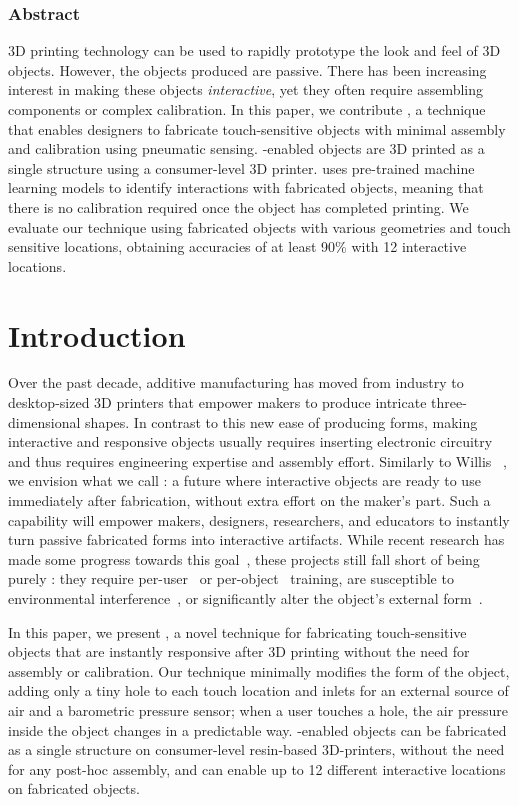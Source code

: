 	\subsubsection*{Abstract}
		3D printing technology can be used to rapidly prototype the look and feel of
		3D objects. However, the objects produced are passive. There has been
		increasing interest in making these objects \emph{interactive}, yet they
		often require assembling components or complex calibration. In this paper,
		we contribute \emph{\at}, a technique that enables designers to fabricate
		touch-sensitive objects with minimal assembly and calibration using
		pneumatic sensing. \at-enabled objects are 3D printed as a single structure
		using a consumer-level 3D printer. \at uses pre-trained machine learning
		models to identify interactions with fabricated objects, meaning that there
		is no calibration required once the object has completed printing. We
		evaluate our technique using fabricated objects with various geometries and
		touch sensitive locations, obtaining accuracies of at least 90\% with 12
		interactive locations.

	\section{Introduction}
		Over the past decade, additive manufacturing has moved from industry to
		desktop-sized 3D printers that empower makers to produce intricate
		three-dimensional shapes. In contrast to this new ease of producing forms,
		making interactive and responsive objects usually requires inserting
		electronic circuitry~\cite{Ramakers:2016, Savage:2015a} and thus requires
		engineering expertise and assembly effort. Similarly to Willis
		\etal~\cite{Willis:2012}, we envision what we call \textit{\pap}: a future
		where interactive objects are ready to use immediately after fabrication,
		without extra effort on the maker's part. Such a capability will empower
		makers, designers, researchers, and educators to instantly turn passive
		fabricated forms into interactive artifacts. While recent research has made
		some progress towards this goal~\cite{Tejada:2018, Schmitz:2019, Ono:2013,
		Shi:2016}, these projects still fall short of being purely \pap: they
		require per-user~\cite{Shi:2016} or per-object~\cite{Tejada:2018,Ono:2013}
		training, are susceptible to environmental
		interference~\cite{Tejada:2018,Shi:2016}, or significantly alter the
		object's external form~\cite{Shi:2016}.

		In this paper, we present \emph{\at}, a novel technique for fabricating
		touch-sensitive objects that are instantly responsive after 3D printing
		without the need for assembly or calibration. Our technique minimally
		modifies the form of the object, adding only a tiny hole to each touch
		location and inlets for an external source of air and a barometric pressure
		sensor; when a user touches a hole, the air pressure inside the object
		changes in a predictable way. \at-enabled objects can be fabricated as a
		single structure on consumer-level resin-based 3D-printers, without the need
		for any post-hoc assembly, and can enable up to 12 different interactive
		locations on fabricated objects.

